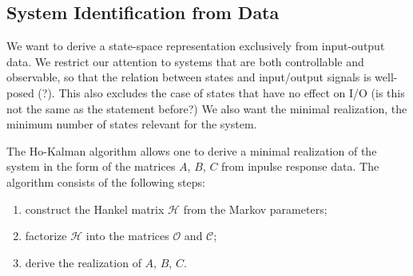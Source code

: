 

\subsection{System Identification from Data}
\label{sec:ho-kalman-algorithm}

We want to derive a state-space representation exclusively from input-output data. We restrict our attention to systems that are both controllable and observable, so that the relation between states and input/output signals is well-posed (?). This also excludes the case of states that have no effect on I/O (is this not the same as the statement before?) We also want the minimal realization, the minimum number of states relevant for the system.

The Ho-Kalman algorithm allows one to derive a minimal realization of the system in the form of the matrices $A$, $B$, $C$ from inpulse response data. The algorithm consists of the following steps:
\begin{enumerate}
\item construct the Hankel matrix $\mathcal{H}$ from the Markov parameters;
\item factorize $\mathcal{H}$ into the matrices $\mathcal{O}$ and $\mathcal{C}$;
\item derive the realization of $A$, $B$, $C$.
\end{enumerate}

